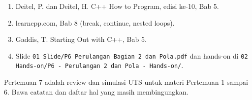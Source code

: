 \documentclass[a4paper]{article}
\begin{document}
\begin{enumerate}
\item Deitel, P. dan Deitel, H. C++ How to Program, edisi ke-10, Bab 5.
\item learncpp.com, Bab 8 (break, continue, nested loops).
\item Gaddis, T. Starting Out with C++, Bab 5.
\item Slide \texttt{01 Slide/P6 Perulangan Bagian 2 dan Pola.pdf} dan hands-on di \texttt{02 Hands-on/P6 - Perulangan 2 dan Pola - Hands-on/}.
\end{enumerate}
\begin{Penting}
Pertemuan 7 adalah review dan simulasi UTS untuk materi Pertemuan 1 sampai 6. Bawa catatan dan daftar hal yang masih membingungkan.
\end{Penting}
\end{document}
